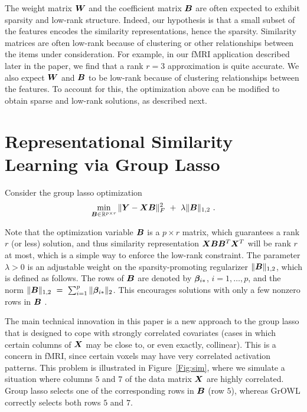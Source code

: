 The weight matrix $\boldsymbol{W}$ and the coefficient matrix $\boldsymbol{B}$ are often expected to exhibit
sparsity and low-rank structure. Indeed, our hypothesis is that a small subset of the
features encodes the similarity representations, hence the sparsity.  Similarity matrices
are often low-rank because of clustering or other relationships between the items under
consideration. For example, in our fMRI application described later in the paper, we find
that a rank $r=3$ approximation is quite accurate. We also expect $\boldsymbol{W}$ and $\boldsymbol{B}$ to be
low-rank because of clustering relationships between the features.  To account for this,
the optimization above can be modified to obtain sparse and low-rank solutions, as
described next.

\section{Representational Similarity Learning via Group Lasso}

Consider the group lasso optimization
\begin{equation}\label{eqn.grouplasso}
 \min_{\bB\in \R^{p\times r}} \|\bY-\bX\bB\|_F^2 \ + \ \lambda \|\bB\|_{1,2} \ .
\end{equation}

Note that the optimization variable $\boldsymbol{B}$ is a $p\times r$ matrix, which guarantees a rank
$r$ (or less) solution, and thus similarity representation $\boldsymbol{X}\boldsymbol{B}\boldsymbol{B}^T\boldsymbol{X}^T$ will be rank
$r$ at most, which is a simple way to enforce the low-rank constraint. The parameter
$\lambda>0$ is an adjustable weight on the sparsity-promoting regularizer
$\|\boldsymbol{B}\|_{1,2}$, which is defined as follows. The rows of $\boldsymbol{B}$ are denoted by
$\boldsymbol{\beta}_{i{\ast}}$, $i=1,\dots,p$, and the norm
$\|\boldsymbol{B}\|_{1,2} \ = \ \sum_{i=1}^p \|\boldsymbol{\beta}_{i{\ast}}\|_2$.
This encourages solutions with only a few nonzero rows in $\boldsymbol{B}$
\citep{obo11,lounici,vandegeer}.

The main technical innovation in this paper is a new approach to the group lasso that is
designed to cope with strongly correlated covariates (\ie cases in which certain columns
of $\boldsymbol{X}$ may be close to, or even exactly, collinear). This is a concern in fMRI, since
certain voxels may have very correlated activation patterns. This problem is illustrated
in Figure~\ref{Fig:sim}, where we simulate a situation where columns $5$ and $7$ of the
data matrix $\boldsymbol{X}$ are highly correlated. Group lasso selects one of the corresponding rows
in $\boldsymbol{B}$ (row $5$), whereas GrOWL correctly selects both rows $5$ and $7$.

